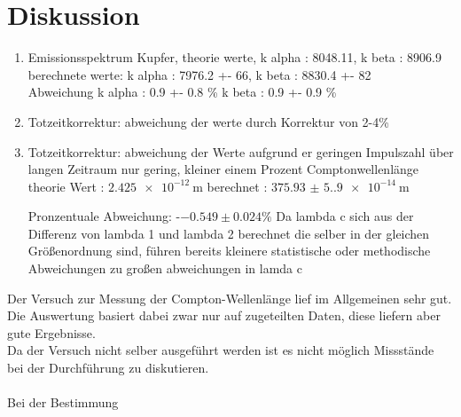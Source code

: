 \section{Diskussion}
    \begin{enumerate}
        \item Emissionsspektrum Kupfer, theorie werte,      k alpha : 8048.11,      k beta : 8906.9\\
                                        berechnete werte:   k alpha : 7976.2 +- 66, k beta : 8830.4 +- 82\\
                                        Abweichung          k alpha : 0.9 +- 0.8 \% k beta : 0.9 +- 0.9 \%
        \item Totzeitkorrektur: abweichung der werte durch Korrektur von 2-4\% 

        \item Totzeitkorrektur: abweichung der Werte aufgrund er geringen Impulszahl über langen Zeitraum nur gering, kleiner einem Prozent
                Comptonwellenlänge theorie Wert : $\SI{2.425e-12}{\meter}$ berechnet : $\SI{375.93(5.9)e-14}{\meter}$

                                 Pronzentuale Abweichung: -$-0.549 \pm 0.024 \%$
                                 Da lambda c sich aus der Differenz von lambda 1 und lambda 2 berechnet die selber in der gleichen Größenordnung 
                                 sind, führen bereits kleinere statistische oder methodische Abweichungen zu großen abweichungen in lamda c
        

    \end{enumerate}

Der Versuch zur Messung der Compton-Wellenlänge lief im Allgemeinen sehr gut. Die Auswertung basiert dabei zwar nur auf zugeteilten Daten, diese liefern aber gute Ergebnisse.\\
Da der Versuch nicht selber ausgeführt werden ist es nicht möglich Missstände bei der Durchführung zu diskutieren.\\\\
\noindent
Bei der Bestimmung
